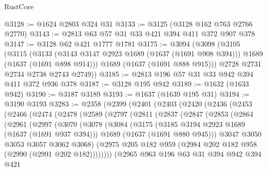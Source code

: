 \begin{lexlean}{RustCore}
\begin{coremodule}
@3128 := @1624 @2803 @324 @31
@3133 := @3125 (@3128 @162 @763 @2766 @2770)
@3143 := @2813 @63 @57 @31 @33 @421 @394 @411 @372 @907 @378
@3147 := @3128 @62 @421 @1777 @1781
@3175 := @3094
    (@3098
      (@3105
        (@3115
          (@3133
            (@3143 @3147 @2923 @1689 (@1637 (@1691 @908 @394)))
            @1689
            (@1637 (@1691 @898 @914)))
          @1689
          (@1637 (@1691 @888 @915)))
        @2728
        @2731
        @2734
        @2738
        @2743
        @2749))
@3185 := @2813 @196 @57 @31 @33 @942 @394 @411 @372 @936 @378
@3187 := @3128 @195 @942
@3189 := @1632 (@1633 @942)
@3190 := @3187 @3189
@3193 := @1637 (@1639 @195 @31)
@3194 := @3190 @3193
@3283 := @2358
    (@2399
      (@2401
        (@2403
          (@2420
            (@2436
              (@2453
                (@2466
                  (@2474
                    (@2478
                      (@2589
                        (@2797
                          (@2811
                            (@2837
                              (@2847
                                (@2853
                                  (@2864
                                    (@2961
                                      (@2997
                                        (@3070
                                          (@3078
                                            (@3084
                                              (@3175
                                                (@3185 @3194 @2923 @1689 (@1637 (@1691 @937 @394)))
                                                @1689
                                                (@1637 (@1691 @880 @945)))
                                              @3047
                                              @3050
                                              @3053
                                              @3057
                                              @3062
                                              @3068)
                                            (@2975
                                              @205
                                              @182
                                              @959
                                              (@2984 @202 @182 @958 (@2990 (@2991 @202 @182))))))))
                                    (@2965
                                      @963
                                      @196
                                      @63
                                      @31
                                      @394
                                      @942
                                      @394
                                      @421

\end{coremodule}
\end{lexlean}
